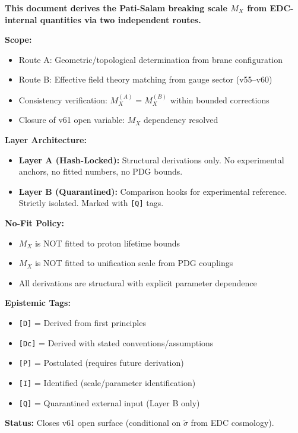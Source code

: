 \documentclass[11pt,a4paper]{article}
\newcommand{\tagD}{\textcolor{green!50!black}{\texttt{[D]}}}
\newcommand{\tagDc}{\textcolor{blue!70!black}{\texttt{[Dc]}}}
\newcommand{\tagP}{\textcolor{orange!80!black}{\texttt{[P]}}}
\newcommand{\tagQ}{\textcolor{red!70!black}{\texttt{[Q]}}}
\newcommand{\tagI}{\textcolor{purple!70!black}{\texttt{[I]}}}
\theoremstyle{definition}
\begin{document}
\begin{readercontract}
\textbf{This document derives the Pati-Salam breaking scale $M_X$ from EDC-internal
quantities via two independent routes.}

\textbf{Scope:}
\begin{itemize}
  \item Route A: Geometric/topological determination from brane configuration
  \item Route B: Effective field theory matching from gauge sector (v55--v60)
  \item Consistency verification: $M_X^{(A)} = M_X^{(B)}$ within bounded corrections
  \item Closure of v61 open variable: $M_X$ dependency resolved
\end{itemize}

\textbf{Layer Architecture:}
\begin{itemize}
  \item \textbf{Layer A (Hash-Locked):} Structural derivations only. No experimental
        anchors, no fitted numbers, no PDG bounds.
  \item \textbf{Layer B (Quarantined):} Comparison hooks for experimental reference.
        Strictly isolated. Marked with \tagQ{} tags.
\end{itemize}

\textbf{No-Fit Policy:}
\begin{itemize}
  \item $M_X$ is NOT fitted to proton lifetime bounds
  \item $M_X$ is NOT fitted to unification scale from PDG couplings
  \item All derivations are structural with explicit parameter dependence
\end{itemize}

\textbf{Epistemic Tags:}
\begin{itemize}
  \item \tagD{} = Derived from first principles
  \item \tagDc{} = Derived with stated conventions/assumptions
  \item \tagP{} = Postulated (requires future derivation)
  \item \tagI{} = Identified (scale/parameter identification)
  \item \tagQ{} = Quarantined external input (Layer B only)
\end{itemize}

\textbf{Status:} Closes v61 open surface (conditional on $\tilde{\sigma}$ from EDC cosmology).
\end{readercontract}
\end{document}
